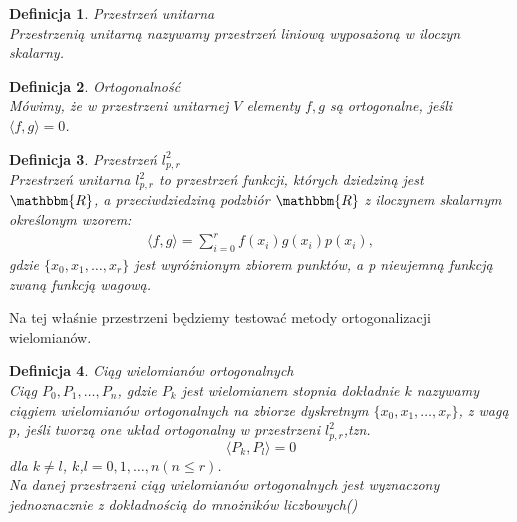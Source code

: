 \documentclass[12pt,wide]{mwart}
\newtheorem{defin}{Definicja}
\begin{document}
\begin{defin}{Przestrzeń unitarna}\\
Przestrzenią unitarną nazywamy przestrzeń liniową wyposażoną w iloczyn skalarny.
\end{defin}

\begin{defin}{Ortogonalność}\\
Mówimy, że w przestrzeni unitarnej $V$ elementy $f,g$ są ortogonalne, jeśli $\langle f,g \rangle = 0$. 
\end{defin}

\begin{defin}{Przestrzeń $l^2_{p,r}$}\\
Przestrzeń unitarna $l^2_{p,r}$ to przestrzeń funkcji, których dziedziną jest $\mathbbm{R}$, a przeciwdziedziną podzbiór $\mathbbm{R}$ z iloczynem skalarnym określonym wzorem:
\begin{eqnarray*}
	\langle  f,g \rangle = \sum^r_{i=0} f(x_i)g(x_i)p(x_i),
\end{eqnarray*}
gdzie $\{x_0,x_1,\ldots,x_r\}$ jest wyróżnionym zbiorem punktów, a p nieujemną funkcją zwaną funkcją wagową.
\end{defin}
Na tej właśnie przestrzeni będziemy testować metody ortogonalizacji wielomianów.

\begin{defin}{Ciąg wielomianów ortogonalnych}\\
Ciąg $P_0,P_1,\ldots,P_n$, gdzie $P_k$ jest wielomianem stopnia dokładnie $k$ nazywamy ciągiem wielomianów ortogonalnych na zbiorze dyskretnym $\{x_0,x_1,\ldots,x_r\}$, z wagą $p$, jeśli tworzą one układ ortogonalny w przestrzeni $l^2_{p,r}$,tzn.
$$
	\langle  P_k,P_l \rangle = 0
$$
dla $k \neq l$, $k$,$l = 0,1,\ldots,n ( n \leq r)$.\\
Na danej przestrzeni ciąg wielomianów ortogonalnych jest wyznaczony jednoznacznie z dokładnością do mnożników liczbowych(\cite[strona 93]{JMJ})
\end{defin}
\end{document}
